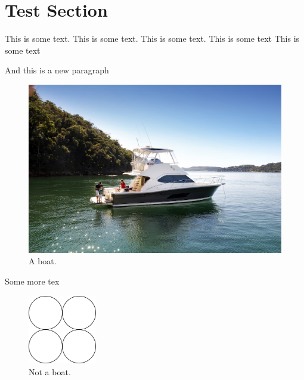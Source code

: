 
\section{Test Section}

This is some text. This is some text. This is some text.
This is some text
This is some text

And this is a new paragraph

\begin{figure}[h]
    \includegraphics[width=\linewidth]{boat.jpg}
    \caption{A boat.}
    \label{fig:test_boat1}
\end{figure}

Some more tex

\begin{figure}[h]
    \centering
    \includegraphics[width=30mm]{diagram.png}
    \caption{Not a boat.}
    \label{fig:test_notboat}
\end{figure}